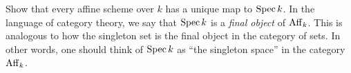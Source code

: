 \documentclass[./main.tex]{subfiles}
\begin{document}
\begin{ex}
  
  Show that every affine scheme over $k$
  has a unique map to $\operatorname{Spec} k$.
  In the language of category theory,
  we say that $\operatorname{Spec} k$ is a \emph{final object} of $\mathrm{Aff}_k$.
  This is analogous to how the singleton set
  is the final object in the category of sets.
  In other words,
  one should think of $\operatorname{Spec} k$ as
  ``the singleton space'' in the category $\mathrm{Aff}_k$.
\end{ex}
\end{document}
